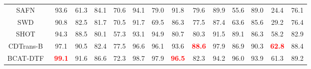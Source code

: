 \documentclass[journal]{IEEEtran}
\begin{document}
\begin{table*}[htp]
{\begin{tabular}{cccccccccccccc}
SAFN~\cite{xu2019largerSAFN}                                & 93.6                 & 61.3                                  & 84.1                 & 70.6                                  & 94.1                                  & 79.0                                  & 91.8                 & 79.6                                  & 89.9                                  & 55.6                                  & 89.0                                 & 24.4                                  & 76.1                                  \\
SWD~\cite{lee2019slicedSWD}                                 & 90.8                 & 82.5                                  & 81.7                 & 70.5                                  & 91.7                                  & 69.5                                  & 86.3                 & 77.5                                  & 87.4                                  & 63.6                                  & 85.6                                 & 29.2                                  & 76.4                                  \\
SHOT~\cite{liang2020weSHOT}                                & 94.3                 & 88.5                                  & 80.1                 & 57.3                                  & 93.1                                  & 94.9                                  & 80.7                 & 80.3                                  & 91.5                                  & 89.1                                  & 86.3                                 & 58.2                                  & 82.9                                  \\ \hline
CDTrans-B~\cite{xu2021cdtransCDTrans}                           & 97.1                 & 90.5                                  & 82.4                 & 77.5                                  & 96.6                                  & 96.1                                  & 93.6                 & \textcolor{red}{\textbf{88.6}}                                  & 97.9                                  & 86.9                                  & 90.3                                 & \textcolor{red}{\textbf{62.8}}                                  & 88.4                                  \\
BCAT-DTF~\cite{wang2022domainBCAT}                            & \textcolor{red}{\textbf{99.1}}                 & 91.6                                  & 86.6                 & 72.3                                  & 98.7                                  & 97.9                                  & \textcolor{red}{\textbf{96.5}}                 & 82.3                                  & 94.2                                  & 96.0                                  & 93.9                                 & 61.3                                  & 89.2                                  \\

\end{tabular}}
\end{table*}
\end{document}
